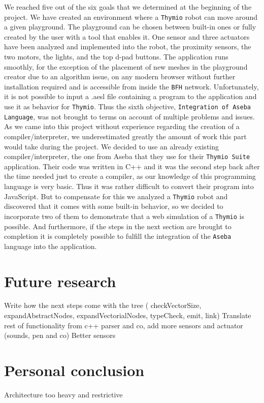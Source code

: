 \documentclass{scrbook}
\begin{document}
We reached five out of the six goals that we determined at the beginning of the project. We have created an environment where a \texttt{Thymio} robot can move around a given playground. The playground can be chosen between built-in ones or fully created by the user with a tool that enables it. 
One sensor and three actuators have been analyzed and implemented into the robot, the proximity sensors, the two motors, the lights, and the top d-pad buttons. The application runs smoothly, for the exception of the placement of new meshes in the playground creator due to an algorithm issue, 
on any modern browser without further installation required and is accessible from inside the \texttt{BFH} network. Unfortunately, it is not possible to input a .aesl file containing a program to the application and use it as behavior for \texttt{Thymio}. 
Thus the sixth objective, \texttt{Integration of Aseba Language}, was not brought to terms on account of multiple problems and issues. As we came into this project without experience regarding the creation of a compiler/interpreter, we underestimated greatly the amount of work this part would take during the project. 
We decided to use an already existing compiler/interpreter, the one from Aseba that they use for their \texttt{Thymio Suite} application. Their code was written in C++ and it was the second step back after the time needed just to create a compiler, as our knowledge of this programming language is very basic. 
Thus it was rather difficult to convert their program into JavaScript. But to compensate for this we analyzed a \texttt{Thymio} robot and discovered that it comes with some built-in behavior, so we decided to incorporate two of them to demonstrate that a web simulation of a \texttt{Thymio} is possible. 
And furthermore, if the steps in the next section are brought to completion it is completely possible to fulfill the integration of the \texttt{Aseba} language into the application.

\section{Future research \label{future}}

Write how the next steps come with the tree ( checkVectorSize, expandAbstractNodes, expandVectorialNodes, typeCheck, emit, link)
Translate rest of functionality from c++ parser and co, add more sensors and actuator (sounds, pen and co)
Better sensors

\section{Personal conclusion}
Architecture too heavy and restrictive
\end{document}

